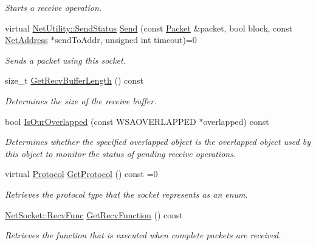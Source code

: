 \begin{DoxyCompactItemize}
\begin{DoxyCompactList}\small\item\em Starts a receive operation. \item\end{DoxyCompactList}\item 
virtual \hyperlink{class_net_utility_a8051eca61204ffd818281419bbf44736}{NetUtility::SendStatus} \hyperlink{class_net_socket_a808894184a1eed1a647e1cdf3c015f3a}{Send} (const \hyperlink{class_packet}{Packet} \&packet, bool block, const \hyperlink{class_net_address}{NetAddress} $\ast$sendToAddr, unsigned int timeout)=0
\begin{DoxyCompactList}\small\item\em Sends a packet using this socket. \item\end{DoxyCompactList}\item 
size\_\-t \hyperlink{class_net_socket_ae2524e6cffa4e30726fde6b4e703ebc3}{GetRecvBufferLength} () const 
\begin{DoxyCompactList}\small\item\em Determines the size of the receive buffer. \item\end{DoxyCompactList}\item 
bool \hyperlink{class_net_socket_a8d65090c23a7624c34bdff512261e74f}{IsOurOverlapped} (const WSAOVERLAPPED $\ast$overlapped) const 
\begin{DoxyCompactList}\small\item\em Determines whether the specified overlapped object is the overlapped object used by this object to monitor the status of pending receive operations. \item\end{DoxyCompactList}\item 
virtual \hyperlink{class_net_socket_simple_a31450636f6fb9ece239c50f616e0d7b0}{Protocol} \hyperlink{class_net_socket_a2c62a6815ffb8b17aabd4963f63c1afc}{GetProtocol} () const =0
\begin{DoxyCompactList}\small\item\em Retrieves the protocol type that the socket represents as an enum. \item\end{DoxyCompactList}\item 
\hyperlink{class_net_socket_a52b5f4de8d0a47fd8620f542b21c076c}{NetSocket::RecvFunc} \hyperlink{class_net_socket_afbb34329c03836f0a6962d7396752979}{GetRecvFunction} () const 
\begin{DoxyCompactList}\small\item\em Retrieves the function that is executed when complete packets are received. \item\end{DoxyCompactList}\item 

\end{DoxyCompactItemize}
